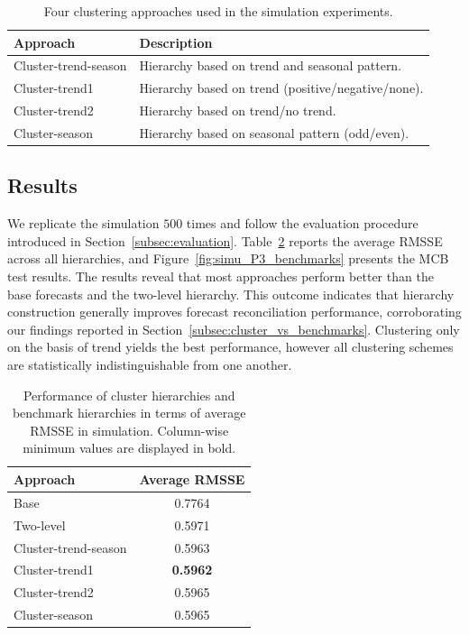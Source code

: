 \documentclass[a4paper,review,12pt,authoryear]{elsarticle}
\begin{document}
\begin{table}[!h]
    \centering
    \caption{\label{tab:simu_methods}Four clustering approaches used in the simulation experiments.}
    \begin{tabular}{ll}\toprule
        Approach & Description \\ \midrule
        Cluster-trend-season & Hierarchy based on trend and seasonal pattern. \\
        Cluster-trend1 &  Hierarchy based on trend (positive/negative/none). \\
        Cluster-trend2 & Hierarchy based on trend/no trend. \\
        Cluster-season & Hierarchy based on seasonal pattern (odd/even). \\\bottomrule
    \end{tabular}
    \label{tab:7}
\end{table}



\subsection{Results}
\label{sec:simu_res}

We replicate the simulation $500$ times and follow the evaluation procedure introduced in Section~\ref{subsec:evaluation}.
Table~\ref{tab:simu_P3} reports the average RMSSE across all hierarchies, and
Figure~\ref{fig:simu_P3_benchmarks} presents the MCB test results. The results reveal that most approaches perform better than the base forecasts and the two-level hierarchy. This outcome indicates that hierarchy construction generally improves forecast reconciliation performance, corroborating our findings reported in Section~\ref{subsec:cluster_vs_benchmarks}. 
Clustering only on the basis of trend yields the best performance, however all clustering schemes are statistically indistinguishable from one another. 


\begin{table}[!h]
    \centering
    \caption{\label{tab:simu_P3}Performance of cluster hierarchies and benchmark hierarchies in terms of average RMSSE in simulation. Column-wise minimum values are displayed in bold.}
    \begin{tabular}{lc}\toprule
        Approach & Average RMSSE \\ \midrule
        Base & 0.7764 \\ 
        Two-level & 0.5971 \\ 
        Cluster-trend-season & 0.5963 \\ 
        Cluster-trend1 & \textbf{0.5962} \\ 
        Cluster-trend2 & 0.5965 \\ 
        Cluster-season & 0.5965 \\ \bottomrule
    \end{tabular}
\end{table}
\end{document}
